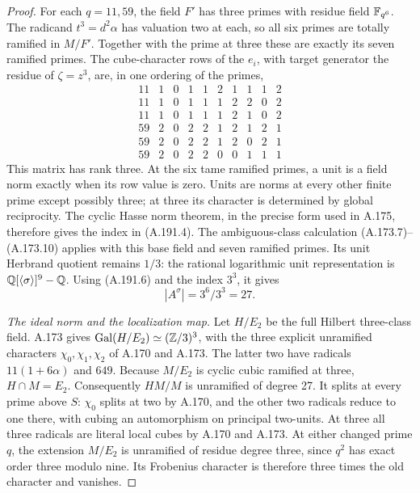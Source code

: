 \begin{proof}
For each \(q=11,59\), the field \(F'\) has three primes
with residue field \(\mathbb F_{q^6}\).  The radicand
\(t^3=d^2\alpha\) has valuation two at each, so all six
primes are totally ramified in \(M/F'\).  Together with the
prime at three these are exactly its seven ramified primes.
The cube-character rows of the \(e_i\), with target generator
the residue of \(\zeta=z^3\), are, in one ordering of the primes,
\[
\begin{array}{c|rrrrrrrrr}
11&1&0&1&1&2&1&1&1&2\\
11&1&0&1&1&1&2&2&0&2\\
11&1&0&1&1&1&2&1&0&2\\
59&2&0&2&2&1&2&1&2&1\\
59&2&0&2&2&1&2&0&2&1\\
59&2&0&2&2&0&0&1&1&1
\end{array}
\tag{A.191.9}
\]
This matrix has rank three.  At the six tame ramified primes,
a unit is a field norm exactly when its row value is zero.
Units are norms at every other finite prime except possibly
three; at three its character is determined by global
reciprocity.  The cyclic Hasse norm theorem, in the precise form
used in A.175, therefore gives the index in (A.191.4).
The ambiguous-class calculation (A.173.7)--(A.173.10) applies
with this base field and seven ramified primes.  Its unit
Herbrand quotient remains \(1/3\): the rational logarithmic
unit representation is \(\mathbb Q[\langle\sigma\rangle]^9-\mathbb Q\).
Using (A.191.6) and the index \(3^3\), it gives
\[
                       |A^\sigma|=3^6/3^3=27.
\tag{A.191.10}
\]

\emph{The ideal norm and the localization map.}
Let \(H/E_2\) be the full Hilbert three-class field.
A.173 gives \(\operatorname{Gal}(H/E_2)\simeq(\mathbb Z/3)^3\),
with the three explicit unramified characters
\(\chi_0,\chi_1,\chi_2\) of A.170 and A.173.
The latter two have radicals
\(11(1+6\alpha)\) and \(649\).
Because \(M/E_2\) is cyclic cubic ramified at three,
\(H\cap M=E_2\).  Consequently \(HM/M\) is unramified
of degree 27.  It splits at every prime above \(S\):
\(\chi_0\) splits at two by A.170, and the other two
radicals reduce to one there, with cubing an automorphism
on principal two-units.  At three all three radicals are
literal local cubes by A.170 and A.173.  At either changed
prime \(q\), the extension \(M/E_2\) is unramified of
residue degree three, since \(q^2\) has exact order three
modulo nine.  Its Frobenius character is therefore three
times the old character and vanishes.


\end{proof}
